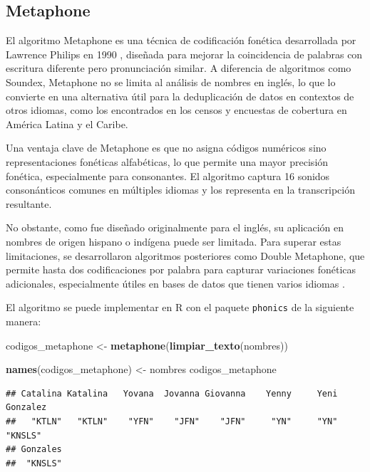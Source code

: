 \documentclass[
  12pt,
]{book}
\newenvironment{Shaded}{\begin{snugshade}}{\end{snugshade}}
\newcommand{\FunctionTok}[1]{\textcolor[rgb]{0.13,0.29,0.53}{\textbf{#1}}}
\newcommand{\NormalTok}[1]{#1}
\newcommand{\OtherTok}[1]{\textcolor[rgb]{0.56,0.35,0.01}{#1}}
\begin{document}
\subsection{Metaphone}\label{metaphone}

El algoritmo Metaphone es una técnica de codificación fonética desarrollada por Lawrence Philips en 1990 \citep{philips1990hanging}, diseñada para mejorar la coincidencia de palabras con escritura diferente pero pronunciación similar. A diferencia de algoritmos como Soundex, Metaphone no se limita al análisis de nombres en inglés, lo que lo convierte en una alternativa útil para la deduplicación de datos en contextos de otros idiomas, como los encontrados en los censos y encuestas de cobertura en América Latina y el Caribe.

Una ventaja clave de Metaphone es que no asigna códigos numéricos sino representaciones fonéticas alfabéticas, lo que permite una mayor precisión fonética, especialmente para consonantes. El algoritmo captura 16 sonidos consonánticos comunes en múltiples idiomas y los representa en la transcripción resultante.

No obstante, como fue diseñado originalmente para el inglés, su aplicación en nombres de origen hispano o indígena puede ser limitada. Para superar estas limitaciones, se desarrollaron algoritmos posteriores como Double Metaphone, que permite hasta dos codificaciones por palabra para capturar variaciones fonéticas adicionales, especialmente útiles en bases de datos que tienen varios idiomas \citep{christen2012data}.

El algoritmo se puede implementar en R con el paquete \texttt{phonics} de la siguiente manera:

\begin{Shaded}
\begin{Highlighting}[]
\NormalTok{codigos\_metaphone }\OtherTok{\textless{}{-}} \FunctionTok{metaphone}\NormalTok{(}\FunctionTok{limpiar\_texto}\NormalTok{(nombres))}

\FunctionTok{names}\NormalTok{(codigos\_metaphone) }\OtherTok{\textless{}{-}}\NormalTok{ nombres}
\NormalTok{codigos\_metaphone}
\end{Highlighting}
\end{Shaded}

\begin{verbatim}
## Catalina Katalina   Yovana  Jovanna Giovanna    Yenny     Yeni Gonzalez 
##   "KTLN"   "KTLN"    "YFN"    "JFN"    "JFN"     "YN"     "YN"  "KNSLS" 
## Gonzales 
##  "KNSLS"
\end{verbatim}
\end{document}
